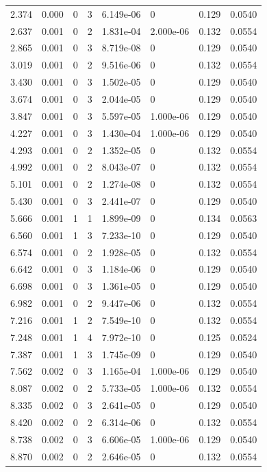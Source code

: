 \documentclass[preview]{standalone}
\begin{document}
{{\begin{tabular}{L{1.2cm}C{1.2cm} C{0.3cm}C{0.5cm} C{1.4cm}C{1.4cm} C{1.4cm}C{1.4cm}}
  2.374  &  0.000  & 0     &  3 &  6.149e-06  & 0  & 0.129 &  0.0540   \\ 
  2.637  &  0.001  & 0     &  2 &  1.831e-04  & 2.000e-06  & 0.132 &  0.0554   \\ 
  2.865  &  0.001  & 0     &  3 &  8.719e-08  & 0  & 0.129 &  0.0540   \\ 
  3.019  &  0.001  & 0     &  2 &  9.516e-06  & 0  & 0.132 &  0.0554   \\ 
  3.430  &  0.001  & 0     &  3 &  1.502e-05  & 0  & 0.129 &  0.0540   \\ 
  3.674  &  0.001  & 0     &  3 &  2.044e-05  & 0  & 0.129 &  0.0540   \\ 
  3.847  &  0.001  & 0     &  3 &  5.597e-05  & 1.000e-06  & 0.129 &  0.0540   \\ 
  4.227  &  0.001  & 0     &  3 &  1.430e-04  & 1.000e-06  & 0.129 &  0.0540   \\ 
  4.293  &  0.001  & 0     &  2 &  1.352e-05  & 0  & 0.132 &  0.0554   \\ 
  4.992  &  0.001  & 0     &  2 &  8.043e-07  & 0  & 0.132 &  0.0554   \\ 
  5.101  &  0.001  & 0     &  2 &  1.274e-08  & 0  & 0.132 &  0.0554   \\ 
  5.430  &  0.001  & 0     &  3 &  2.441e-07  & 0  & 0.129 &  0.0540   \\ 
  5.666  &  0.001  & 1     &  1 &  1.899e-09  & 0  & 0.134 &  0.0563   \\ 
  6.560  &  0.001  & 1     &  3 &  7.233e-10  & 0  & 0.129 &  0.0540   \\ 
  6.574  &  0.001  & 0     &  2 &  1.928e-05  & 0  & 0.132 &  0.0554   \\ 
  6.642  &  0.001  & 0     &  3 &  1.184e-06  & 0  & 0.129 &  0.0540   \\ 
  6.698  &  0.001  & 0     &  3 &  1.361e-05  & 0  & 0.129 &  0.0540   \\ 
  6.982  &  0.001  & 0     &  2 &  9.447e-06  & 0  & 0.132 &  0.0554   \\ 
  7.216  &  0.001  & 1     &  2 &  7.549e-10  & 0  & 0.132 &  0.0554   \\ 
  7.248  &  0.001  & 1     &  4 &  7.972e-10  & 0  & 0.125 &  0.0524   \\ 
  7.387  &  0.001  & 1     &  3 &  1.745e-09  & 0  & 0.129 &  0.0540   \\ 
  7.562  &  0.002  & 0     &  3 &  1.165e-04  & 1.000e-06  & 0.129 &  0.0540   \\ 
  8.087  &  0.002  & 0     &  2 &  5.733e-05  & 1.000e-06  & 0.132 &  0.0554   \\ 
  8.335  &  0.002  & 0     &  3 &  2.641e-05  & 0  & 0.129 &  0.0540   \\ 
  8.420  &  0.002  & 0     &  2 &  6.314e-06  & 0  & 0.132 &  0.0554   \\ 
  8.738  &  0.002  & 0     &  3 &  6.606e-05  & 1.000e-06  & 0.129 &  0.0540   \\ 
  8.870  &  0.002  & 0     &  2 &  2.646e-05  & 0  & 0.132 &  0.0554   \\ 
\hline 
\end{tabular} 

}}
\end{document}
